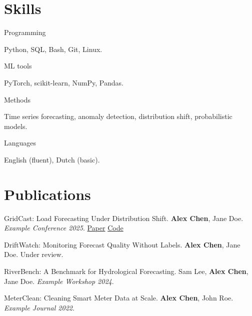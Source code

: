 \documentclass[a4paper,10pt]{article}
\makeatletter
\newcommand{\sep}{\unskip\nobreak\hspace{0.45em}\textcolor{Muted}{\textperiodcentered}\hspace{0.45em}\ignorespaces}
\newcommand{\links}[1]{{\small #1}}   %
\newcommand{\me}{\textbf{Alex Chen}}
\newcommand{\entry}[2]{%
  \par\if@nobreak\else\vspace{4pt}\fi
  \begin{minipage}[t]{0.155\textwidth}\raggedright\textcolor{Muted}{\small #1}\end{minipage}%
  \hfill
  \begin{minipage}[t]{0.825\textwidth}\raggedright #2\end{minipage}\par}
\makeatother
\begin{document}
\section{Skills}
\entry{Programming}{Python, SQL, Bash, Git, Linux.}
\entry{ML tools}{PyTorch, scikit-learn, NumPy, Pandas.}
\entry{Methods}{Time series forecasting, anomaly detection, distribution shift, probabilistic models.}
\entry{Languages}{English (fluent), Dutch (basic).}

\section{Publications}
\begin{publist}
  \item GridCast: Load Forecasting Under Distribution Shift. \me, Jane Doe. \textit{Example Conference 2025}. \links{\href{https://example.com/gridcast}{Paper} \sep \href{https://github.com/example/gridcast}{Code}}

  \item DriftWatch: Monitoring Forecast Quality Without Labels. \me, Jane Doe. Under review.

  \item RiverBench: A Benchmark for Hydrological Forecasting. Sam Lee, \me, Jane Doe. \textit{Example Workshop 2024}.

  \item MeterClean: Cleaning Smart Meter Data at Scale. \me, John Roe. \textit{Example Journal 2022}.
\end{publist}
\end{document}
